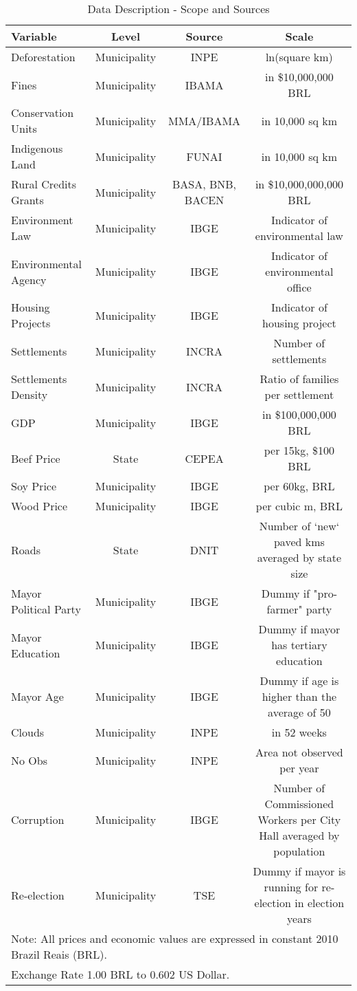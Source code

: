 \begin{table}[H]
\scriptsize
    \caption{Data Description - Scope and Sources}
       \begin{tabularx}{\linewidth}{l ccc}
     \hline
     \hline
       Variable & \centering Level & Source & \centering\arraybackslash Scale\\
     \hline
    Deforestation & Municipality & INPE & ln(square km)\\
    Fines & Municipality & IBAMA & in \$10,000,000 BRL \\
    Conservation Units & Municipality & MMA/IBAMA & in 10,000 sq km \\
    Indigenous Land   & Municipality & FUNAI & in 10,000 sq km \\
    Rural Credits Grants & Municipality & BASA, BNB, BACEN & in \$10,000,000,000 BRL \\
    Environment Law & Municipality & IBGE & Indicator of environmental law\\
    Environmental Agency   & Municipality & IBGE & Indicator of environmental office \\
    Housing Projects   & Municipality & IBGE & Indicator of housing project \\
    Settlements  & Municipality & INCRA & Number of settlements \\
    Settlements Density & Municipality & INCRA & Ratio of families per settlement \\
    GDP   & Municipality & IBGE & in \$100,000,000 BRL\\
    Beef Price   & State & CEPEA & per 15kg, \$100 BRL\\
    Soy Price  & Municipality & IBGE & per 60kg, BRL \\
    Wood Price  & Municipality & IBGE & per cubic m, BRL\\
    Roads & State & DNIT & Number of `new` paved kms averaged by state size\\
    Mayor Political Party   & Municipality & IBGE & Dummy if "pro-farmer" party\\
    Mayor Education   & Municipality & IBGE & Dummy  if mayor has tertiary education  \\
    Mayor Age  & Municipality & IBGE & Dummy if age is higher than the average of 50\\
    Clouds  & Municipality & INPE & in 52 weeks\\
    No Obs & Municipality & INPE & Area not observed per year\\
    Corruption   & Municipality & IBGE & Number of Commissioned Workers per City Hall averaged by population \\
    Re-election & Municipality & TSE & Dummy if mayor is running for re-election in election years\\
    \hline
    \hline
    \multicolumn{4}{l}{\footnotesize Note: All prices and economic values are expressed in constant 2010 Brazil Reais (BRL).} \\
    \multicolumn{4}{l}{\footnotesize Exchange Rate 1.00 BRL to 0.602 US Dollar.} \\
    \end{tabularx}%
 \label{tab:sources}%
\end{table}%


